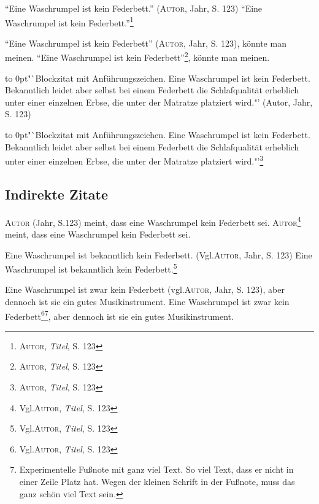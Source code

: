 "`Eine Waschrumpel ist kein Federbett."' (\textsc{Autor}, Jahr, S. 123)
"`Eine Waschrumpel ist kein Federbett."'\footnote{\textsc{Autor},
\textit{Titel}, S. 123}

"`Eine Waschrumpel ist kein Federbett"' (\textsc{Autor}, Jahr, S. 123), könnte man meinen.
"`Eine Waschrumpel ist kein Federbett"'\footnote{\textsc{Autor},
\textit{Titel}, S. 123}, könnte man meinen.

\begin{addmargin}[1cm]{0pt}
\itshape\strut\hbox to 0pt{\hss"`}Blockzitat mit Anführungszeichen. Eine Waschrumpel
ist kein Federbett. Bekanntlich leidet aber selbst bei einem Federbett
die Schlafqualität erheblich unter einer einzelnen Erbse, die unter der
Matratze platziert wird."' (Autor, Jahr, S. 123)
\end{addmargin}

\begin{addmargin}[1cm]{0pt}
\strut\hbox to 0pt{\hss"`}Blockzitat mit Anführungszeichen. Eine Waschrumpel
ist kein Federbett. Bekanntlich leidet aber selbst bei einem Federbett
die Schlafqualität erheblich unter einer einzelnen Erbse, die unter der
Matratze platziert wird."'\footnote{\textsc{Autor}, \textit{Titel}, S.
123}
\end{addmargin}

\subsection{Indirekte Zitate}
\textsc{Autor} (Jahr, S.\@ 123) meint, dass eine Waschrumpel kein
Federbett sei.
\textsc{Autor}\footnote{Vgl.\@ \textsc{Autor}, \textit{Titel}, S. 123}
meint, dass eine Waschrumpel kein Federbett sei.

Eine Waschrumpel ist bekanntlich kein Federbett. (Vgl.\@ \textsc{Autor},
Jahr, S. 123) Eine Waschrumpel ist bekanntlich kein
Federbett.\footnote{Vgl.\@ \textsc{Autor}, \textit{Titel}, S. 123}

Eine Waschrumpel ist zwar kein Federbett (vgl.\@ \textsc{Autor}, Jahr,
S. 123), aber dennoch ist sie ein gutes Musikinstrument. Eine
Waschrumpel ist zwar kein Federbett\footnote{Vgl.\@ \textsc{Autor},
\textit{Titel}, S.
123}\multiplefootnoteseparator\footnote{Experimentelle Fußnote mit ganz
viel Text. So viel Text, dass er nicht in einer Zeile Platz hat. Wegen
der kleinen Schrift in der Fußnote, muss das ganz schön viel Text
sein.},
 aber dennoch ist sie ein gutes Musikinstrument.

